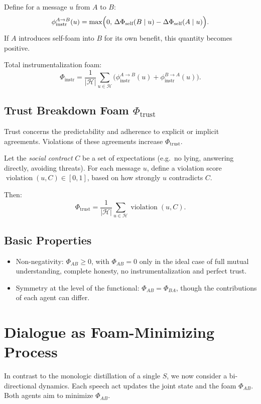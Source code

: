 \documentclass[11pt,a4paper]{article}
\begin{document}
Define for a message \(u\) from \(A\) to \(B\):
\[
  \phi_{\text{instr}}^{A\to B}(u) =
  \max\Bigl(
    0,\,
    \Delta\Phi_{\text{self}}(B\mid u) - \Delta\Phi_{\text{self}}(A\mid u)
  \Bigr).
\]
If \(A\) introduces self-foam into \(B\) for its own benefit, this quantity
becomes positive.

Total instrumentalization foam:
\[
  \Phi_{\text{instr}} =
  \frac{1}{|\mathcal{H}|}
  \sum_{u \in \mathcal{H}}
  \bigl(
    \phi_{\text{instr}}^{A\to B}(u) +
    \phi_{\text{instr}}^{B\to A}(u)
  \bigr).
\]

\subsection{Trust Breakdown Foam \texorpdfstring{\(\Phi_{\text{trust}}\)}{Φ\_trust}}

Trust concerns the predictability and adherence to explicit or implicit
agreements. Violations of these agreements increase \(\Phi_{\text{trust}}\).

Let the \emph{social contract} \(C\) be a set of expectations (e.g.\ no
lying, answering directly, avoiding threats). For each message \(u\), define
a violation score \(\operatorname{violation}(u, C) \in [0,1]\), based on how
strongly \(u\) contradicts \(C\).

Then:
\[
  \Phi_{\text{trust}} =
  \frac{1}{|\mathcal{H}|}
  \sum_{u \in \mathcal{H}} \operatorname{violation}(u, C).
\]

\subsection{Basic Properties}

\begin{itemize}
  \item Non-negativity:
        \(\Phi_{AB} \ge 0\), with \(\Phi_{AB} = 0\) only in the ideal case of
        full mutual understanding, complete honesty, no instrumentalization
        and perfect trust.
  \item Symmetry at the level of the functional:
        \(\Phi_{AB} = \Phi_{BA}\), though the contributions of each agent
        can differ.
\end{itemize}

\section{Dialogue as Foam-Minimizing Process}

In contrast to the monologic distillation of a single \(S\), we now consider
a bi-directional dynamics. Each speech act updates the joint state and the
foam \(\Phi_{AB}\). Both agents aim to minimize \(\Phi_{AB}\).
\end{document}
